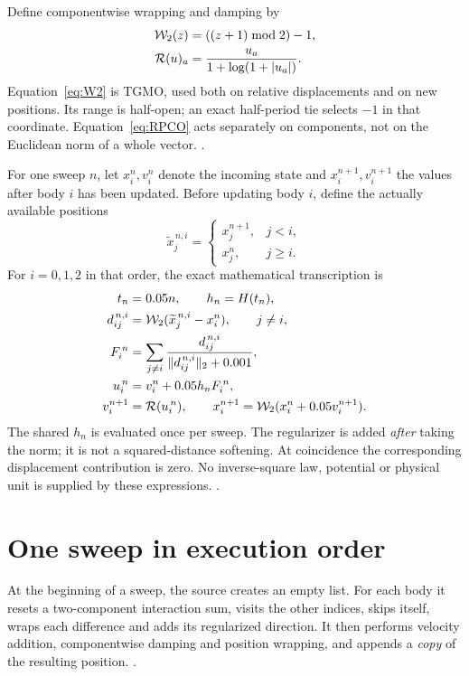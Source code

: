 Define componentwise wrapping and damping by
\begin{align}
\mathcal W_2(z)&=((z+1)\bmod 2)-1,\label{eq:W2}\\
\mathcal R(u)_a&=\frac{u_a}{1+\log(1+|u_a|)}.\label{eq:RPCO}
\end{align}
Equation~\eqref{eq:W2} is TGMO, used both on relative displacements and on
new positions. Its range is half-open; an exact half-period tie selects
$-1$ in that coordinate. Equation~\eqref{eq:RPCO} acts separately on
components, not on the Euclidean norm of a whole vector.
. 

For one sweep $n$, let $x_i^n,v_i^n$ denote the incoming state and
$x_i^{n+1},v_i^{n+1}$ the values after body $i$ has been updated. Before
updating body $i$, define the actually available positions
\begin{equation}\label{eq:mixed01}
\widetilde x_j^{\,n,i}=
\begin{cases}
x_j^{n+1}, &j<i,\\
x_j^n, &j\geq i.
\end{cases}
\end{equation}
For $i=0,1,2$ in that order, the exact mathematical transcription is
\begin{align}
t_n&=0.05n,\qquad h_n=H(t_n),\label{eq:clock01}\\
d_{ij}^{\,n,i}&=\mathcal W_2(\widetilde x_j^{\,n,i}-x_i^n),\qquad j\ne i,\label{eq:pairdiff}\\
F_i^{\,n}&=\sum_{j\ne i}
 \frac{d_{ij}^{\,n,i}}{\|d_{ij}^{\,n,i}\|_2+0.001},\label{eq:pairforce}\\
u_i^{\,n}&=v_i^n+0.05h_nF_i^{\,n},\label{eq:kick01}\\
v_i^{n+1}&=\mathcal R(u_i^{\,n}),\qquad
x_i^{n+1}=\mathcal W_2(x_i^n+0.05v_i^{n+1}).\label{eq:move01}
\end{align}
The shared $h_n$ is evaluated once per sweep. The regularizer is added
\emph{after} taking the norm; it is not a squared-distance softening.
At coincidence the corresponding displacement contribution is zero.
No inverse-square law, potential or physical unit is supplied by these
expressions. . 

\section{One sweep in execution order}
At the beginning of a sweep, the source creates an empty
 list. For each body it resets a two-component
interaction sum, visits the other indices, skips itself, wraps each
difference and adds its regularized direction. It then performs
velocity addition, componentwise damping and position wrapping, and appends
a \emph{copy} of the resulting position. .

